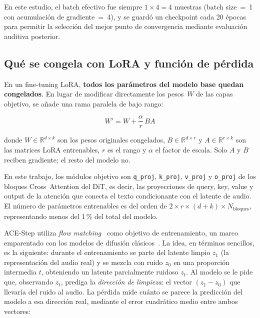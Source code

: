 \documentclass[%
    school=etsisi,%
    type=pfg,%
    degree=61CD,%
]{upm-report}
\begin{document}
En este estudio, el batch efectivo fue siempre $1 \times 4 = 4$ muestras (batch size~=~1 con acumulaci\'on de gradiente~=~4), y se guard\'o un checkpoint cada 20 \'epocas para permitir la selecci\'on del mejor punto de convergencia mediante evaluaci\'on auditiva posterior.

\subsection{Qu\'e se congela con LoRA y funci\'on de p\'erdida}
\label{ss:lora-freeze-loss}

En un fine-tuning LoRA, \textbf{todos los par\'ametros del modelo base quedan congelados}. En lugar de modificar directamente los pesos~$W$ de las capas objetivo, se a\~nade una rama paralela de bajo rango:

\begin{equation}
    W' = W + \frac{\alpha}{r}\,BA
    \label{eq:lora}
\end{equation}

donde $W \in \mathbb{R}^{d \times k}$ son los pesos originales congelados, $B \in \mathbb{R}^{d \times r}$ y $A \in \mathbb{R}^{r \times k}$ son las matrices LoRA entrenables, $r$ es el rango y $\alpha$ el factor de escala. Solo $A$ y $B$ reciben gradiente; el resto del modelo no.

En este trabajo, los m\'odulos objetivo son \texttt{q\_proj}, \texttt{k\_proj}, \texttt{v\_proj} y \texttt{o\_proj} de los bloques Cross~Attention del DiT, es decir, las proyecciones de query, key, value y output de la atenci\'on que conecta el texto condicionante con el latente de audio. El n\'umero de par\'ametros entrenables es del orden de $2 \times r \times (d + k) \times N_\text{bloques}$, representando menos del 1\,\% del total del modelo.

ACE-Step utiliza \textit{flow matching}~\cite{lipman2023flow} como objetivo de entrenamiento, un marco emparentado con los modelos de difusi\'on cl\'asicos~\cite{ho2020ddpm}. La idea, en t\'erminos sencillos, es la siguiente: durante el entrenamiento se parte del latente limpio $z_1$ (la representaci\'on del audio real) y se mezcla con ruido $z_0$ en una proporci\'on intermedia $t$, obteniendo un latente parcialmente ruidoso $z_t$. Al modelo se le pide que, observando $z_t$, prediga la \emph{direcci\'on de limpieza}: el vector $(z_1 - z_0)$ que llevar\'ia del ruido al audio. La p\'erdida mide cu\'anto se parece la predicci\'on del modelo a esa direcci\'on real, mediante el error cuadr\'atico medio entre ambos vectores:
\end{document}
